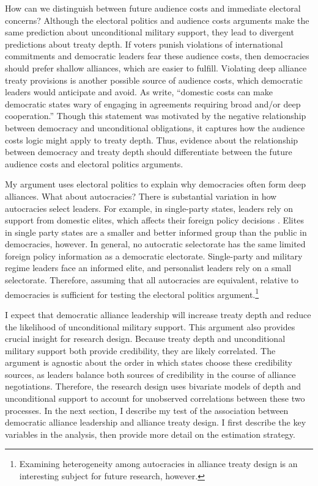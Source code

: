 \documentclass[12pt]{article}
\begin{document}
How can we distinguish between future audience costs and immediate electoral concerns? 
Although the electoral politics and audience costs arguments make the same prediction about unconditional military support, they lead to divergent predictions about treaty depth. 
If voters punish violations of international commitments and democratic leaders fear these audience costs, then democracies should prefer shallow alliances, which are easier to fulfill. 
Violating deep alliance treaty provisions is another possible source of audience costs, which democratic leaders would anticipate and avoid.
As \citet[pg. 980]{Chibaetal2015} write, ``domestic costs can make democratic states wary of engaging in agreements requiring broad and/or deep cooperation.''  
Though this statement was motivated by the negative relationship between democracy and unconditional obligations, it captures how the audience costs logic might apply to treaty depth. 
Thus, evidence about the relationship between democracy and treaty depth should differentiate between the future audience costs and electoral politics arguments. 


My argument uses electoral politics to explain why democracies often form deep alliances. 
What about autocracies? 
There is substantial variation in how autocracies select leaders. 
For example, in single-party states, leaders rely on support from domestic elites, which affects their foreign policy decisions \citep{Weeks2014}.
Elites in single party states are a smaller and better informed group than the public in democracies, however.   
In general, no autocratic selectorate has the same limited foreign policy information as a democratic electorate.
Single-party and military regime leaders face an informed elite, and personalist leaders rely on a small selectorate. 
Therefore, assuming that all autocracies are equivalent, relative to democracies is sufficient for testing the electoral politics argument.\footnote{Examining heterogeneity among autocracies in alliance treaty design is an interesting subject for future research, however.} 


I expect that democratic alliance leadership will increase treaty depth and reduce the likelihood of unconditional military support. 
This argument also provides crucial insight for research design. 
Because treaty depth and unconditional military support both provide credibility, they are likely correlated.
The argument is agnostic about the order in which states choose these credibility sources, as leaders balance both sources of credibility in the course of alliance negotiations. 
Therefore, the research design uses bivariate models of depth and unconditional support to account for unobserved correlations between these two processes. 
In the next section, I describe my test of the association between democratic alliance leadership and alliance treaty design. 
I first describe the key variables in the analysis, then provide more detail on the estimation strategy.
\end{document}

